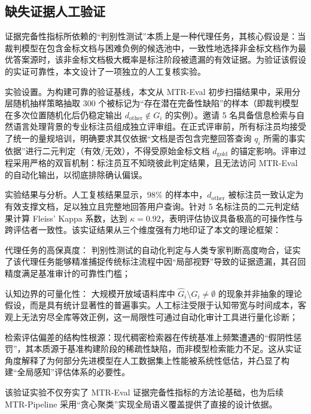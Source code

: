 \subsection{缺失证据人工验证}



证据完备性指标所依赖的“判别性测试”本质上是一种代理任务，其核心假设是：当裁判模型在包含金标文档与困难负例的候选池中，一致性地选择非金标文档作为最优答案源时，该非金标文档极大概率是标注阶段被遗漏的有效证据。为验证该假设的实证可靠性，本文设计了一项独立的人工复核实验。



实验设置。为构建可靠的验证基线，本文从 MTR-Eval 初步扫描结果中，采用分层随机抽样策略抽取 300 个被标记为“存在潜在完备性缺陷”的样本（即裁判模型在多次位置随机化后仍稳定输出 $d_{\text{other}} \notin G_i$ 的实例）。邀请 5 名具备信息检索与自然语言处理背景的专业标注员组成独立评审组。在正式评审前，所有标注员均接受了统一的量规培训，明确要求其仅依据“文档是否包含完整回答查询 $q_i$ 所需的事实依据”进行二元判定（有效/无效），不得受原始金标文档 $d_{\text{gold}}$ 的锚定影响。评审过程采用严格的双盲机制：标注员互不知晓彼此判定结果，且无法访问 MTR-Eval 的自动化输出，以彻底排除确认偏误。



实验结果与分析。人工复核结果显示，98\% 的样本中，$d_{\text{other}}$ 被标注员一致认定为有效支撑文档，足以独立且完整地回答用户查询。针对 5 名标注员的二元判定结果计算 Fleiss' Kappa 系数，达到 $\kappa = 0.92$，表明评估协议具备极高的可操作性与跨评估者一致性。该实证结果从三个维度强有力地印证了本文的理论框架：

代理任务的高保真度： 判别性测试的自动化判定与人类专家判断高度吻合，证实了该代理任务能够精准捕捉传统标注流程中因“局部视野”导致的证据遗漏，其召回精度满足基准审计的可靠性门槛；

认知边界的可量化性： 大规模开放域语料库中 $\hat{G}_i \setminus G_i \neq \emptyset$ 的现象并非抽象的理论假设，而是具有统计显著性的普遍事实。人工标注受限于认知带宽与时间成本，客观上无法穷尽全库等效正例，这一局限性可通过自动化审计工具进行量化诊断；

检索评估偏差的结构性根源：现代稠密检索器在传统基准上频繁遭遇的“假阴性惩罚”，其本质源于基准构建阶段的稀疏性缺陷，而非模型检索能力不足。这从实证角度解释了为何部分先进模型在人工数据集上性能被系统性低估，并凸显了构建“全局感知”评估体系的必要性。




该验证实验不仅夯实了 MTR-Eval 证据完备性指标的方法论基础，也为后续 MTR-Pipeline 采用“贪心聚类”实现全局语义覆盖提供了直接的设计依据。



